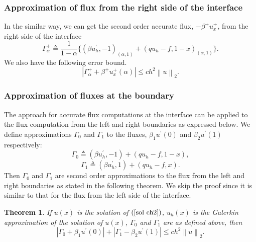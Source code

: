 \documentclass[11pt]{article}
\numberwithin{equation}{section}
\newtheorem{theorem}{Theorem}[section]
\begin{document}
\subsubsection*{Approximation of flux from the right side of the interface}

In the similar way, we can get the second order accurate flux, $-\beta^+ u_x^+ $, from the right side of the interface
\begin{equation*}
 \Gamma_{\alpha}^{+}\triangleq\frac{1}{1-\alpha}\{(\beta u_{h}^{'}, -1)_{(\alpha,1)}+(qu_{h}-f, 1-x)_{(\alpha,1)}\}.
\end{equation*}
We also have the following error bound.
\begin{equation*}\label{}
  \left|\Gamma_{\alpha}^{+}+\beta^+ u_{x}^{+}\left(\alpha\right)\right|\leq ch^{2}\left\|u\right\|_{2}.
\end{equation*}

\subsubsection*{Approximation of fluxes at the boundary}

The approach for accurate flux computations at the interface
can be applied to the flux computation from the left and right boundaries as expressed below.
We define approximations $\Gamma_{0}$ and $\Gamma_{1}$ to the fluxes,
$\beta_{1}u^{'}\left(0\right)$ and $\beta_{2}u^{'}\left(1\right)$ respectively:
\begin{equation*}\label{}
\Gamma_{0} \triangleq\left(\beta u_{h}^{'}, -1\right)+\left(qu_{h}-f, 1-x\right),
\end{equation*}
\begin{equation*}\label{}
\Gamma_{1}\triangleq\left(\beta u_{h}^{'}, 1\right)+\left(qu_{h}-f, x\right).
\end{equation*}
Then $\Gamma_{0}$ and $\Gamma_{1}$ are second order approximations to the flux
from the left and right boundaries as stated in the following theorem.
We skip the proof since it is similar to that for the flux from the left side of the interface.
\begin{theorem}{}
If $u\left(x\right)$ is the solution of $\left(\ref{sol ch2}\right)$,
$u_{h}\left(x\right)$ is the Galerkin approximation of the solution of $u\left(x\right)$,
$\Gamma_{0}$ and $\Gamma_{1}$ are as defined above,
then
\begin{equation*}\label{}
\left|\Gamma_{0}+\beta_{1}u^{'}\left(0\right)\right|+\left|\Gamma_{1}-\beta_{2}u^{'}\left(1\right)\right|\leq c h^{2}\left\|u\right\|_{2}.
\end{equation*}
\end{theorem}
\end{document}
